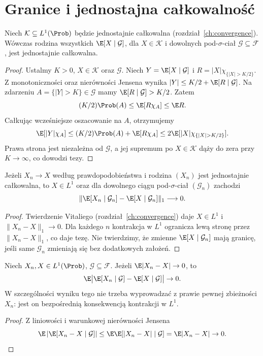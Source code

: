 \section{Granice i jednostajna całkowalność}
\begin{twierdzenie}
Niech $\mathcal K\subseteq L^1(\Prob)$ będzie jednostajnie
całkowalna (rozdział~\ref{ch:convergence}).
Wówczas rodzina wszystkich $\E[X\mid\mathcal G]$,
dla $X\in\mathcal K$ i dowolnych pod-$\sigma$-ciał
$\mathcal G\subseteq\mathcal F$, jest jednostajnie całkowalna.
\end{twierdzenie}
\begin{proof}
Ustalmy $K>0$, $X\in\mathcal K$ oraz $\mathcal G$.
Niech $Y=\E[X\mid\mathcal G]$ i
$R=|X|\chi_{\{|X|>K/2\}}$.
Z monotoniczności oraz nierówności Jensena wynika
$|Y|\leq K/2+\E[R\mid\mathcal G]$.
Na zdarzeniu $A=\{|Y|>K\}\in\mathcal G$ mamy
$\E[R\mid\mathcal G]>K/2$. Zatem
\[
(K/2)\Prob(A)\leq\E[R\chi_{A}]\leq\E R.
\]
Całkując wcześniejsze oszacowanie na $A$, otrzymujemy
\[
\E[|Y|\chi_{A}]\leq (K/2)\Prob(A)+\E[R\chi_{A}]
\leq 2\E[|X|\chi_{\{|X|>K/2\}}].
\]
Prawa strona jest niezależna od $\mathcal G$, a jej
supremum po $X\in\mathcal K$ dąży do zera przy
$K\to\infty$, co dowodzi tezy.
\end{proof}
\begin{wniosek}
Jeżeli $X_n\to X$ według prawdopodobieństwa i rodzina
$(X_n)$ jest jednostajnie całkowalna, to $X\in L^1$
oraz dla dowolnego ciągu pod-$\sigma$-ciał
$(\mathcal G_n)$ zachodzi
\[
\|\E[X_n\mid\mathcal G_n]-\E[X\mid\mathcal G_n]\|_1
\longrightarrow0.
\]
\end{wniosek}
\begin{proof}
Twierdzenie Vitaliego (rozdział~\ref{ch:convergence})
daje $X\in L^1$ i $\|X_n-X\|_1\to0$.
Dla każdego $n$ kontrakcja w $L^1$ ogranicza lewą
stronę przez $\|X_n-X\|_1$, co daje tezę.
Nie twierdzimy, że zmienne $\E[X\mid\mathcal G_n]$
mają granicę, jeśli same $\mathcal G_n$ zmieniają się
bez dodatkowych założeń.
\end{proof}


\begin{twierdzenie}
Niech $X_n,X\in L^1(\Prob)$, $\mathcal G\subseteq\mathcal F$.
Jeżeli $\E|X_n-X|\to0$, to
\[
\E\bigl|\E[X_n\mid\mathcal G]-\E[X\mid\mathcal G]\bigr|\to0.
\]
W szczególności wyniku tego nie trzeba wyprowadzać
z prawie pewnej zbieżności $X_n$: jest on bezpośrednią
konsekwencją kontrakcji w $L^1$.
\end{twierdzenie}
\begin{proof}
Z liniowości i warunkowej nierówności Jensena
\[
\E\left|\E[X_n-X\mid\mathcal G]\right|
\leq \E\E[|X_n-X|\mid\mathcal G]=\E|X_n-X|\to0.
\]
\end{proof}

